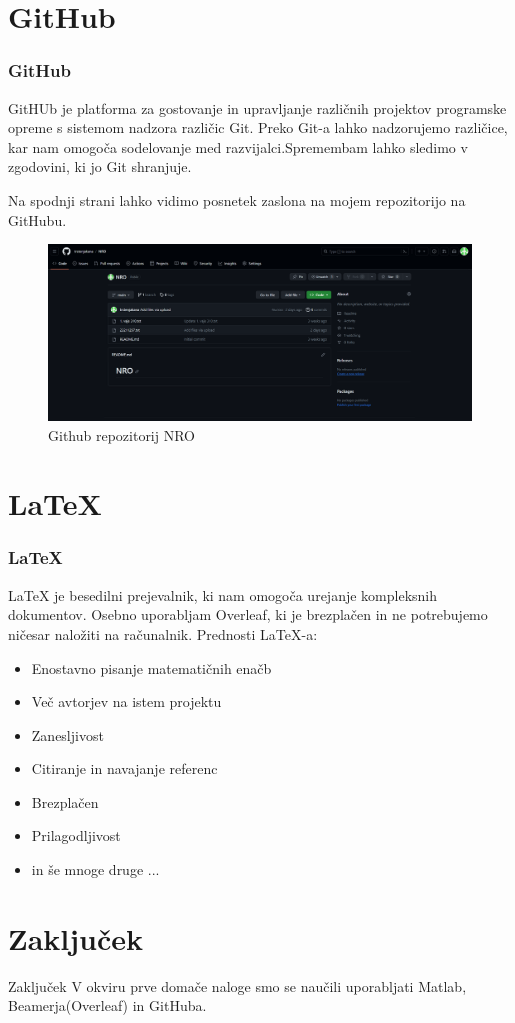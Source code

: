 \documentclass{beamer}
\begin{document}
\section{GitHub}
\begin{frame}
\frametitle{GitHub}
GitHUb je platforma za gostovanje in upravljanje različnih projektov programske opreme s sistemom nadzora različic Git. Preko Git-a lahko nadzorujemo različice, kar nam omogoča sodelovanje med razvijalci.Spremembam lahko sledimo v zgodovini, ki jo Git shranjuje.

Na spodnji strani lahko vidimo posnetek zaslona na mojem repozitorijo na GitHubu.

\begin{figure}
  \includegraphics[width=0.7\linewidth]{GitHub.png}
    \caption{Github repozitorij NRO}
  \end{figure}
\end{frame}
\section{LaTeX}
\begin{frame}
    \frametitle{LaTeX}
    LaTeX je besedilni prejevalnik, ki nam omogoča urejanje kompleksnih dokumentov. Osebno uporabljam Overleaf, ki je brezplačen in ne potrebujemo ničesar naložiti na računalnik.
    Prednosti LaTeX-a:
    \begin{itemize}
        \item Enostavno pisanje matematičnih enačb
        \item Več avtorjev na istem projektu
        \item Zanesljivost
        \item Citiranje in navajanje referenc
        \item Brezplačen
        \item Prilagodljivost
        \item in še mnoge druge ... 

    \end{itemize}
\end{frame}
\section{Zaključek}
\begin{frame}{Zaključek}
    V okviru prve domače naloge smo se naučili uporabljati Matlab, Beamerja(Overleaf) in GitHuba.
    
\end{frame}
\end{document}
